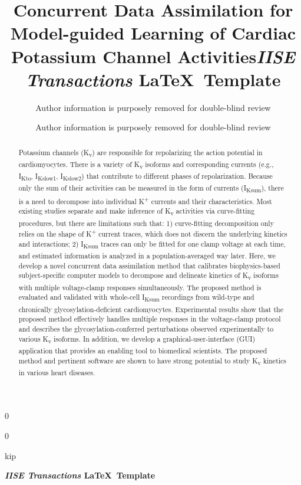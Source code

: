 \documentclass[11pt]{article}
\newcommand{\blind}{0}
\begin{document}
	\def\spacingset#1{\renewcommand{\baselinestretch}%
		{#1}\small\normalsize} \spacingset{1}

	\blind
	{
		\title{\bf Concurrent Data Assimilation for Model-guided Learning of Cardiac Potassium Channel Activities}
		\author{Author information is purposely removed for double-blind review}
		\date{}
		\maketitle
	} \fi

	\blind
	{
        \title{\bf \emph{IISE Transactions} \LaTeX \ Template}
		\author{Author information is purposely removed for double-blind review}

\bigskip
		\bigskip
		\bigs   kip
		\begin{center}
			{\LARGE\bf \emph{IISE Transactions} \LaTeX \ Template}
		\end{center}
		\medskip
	} \fi
	\bigskip

\begin{abstract}
Potassium channels (K\textsubscript{v}) are responsible for repolarizing the action potential in cardiomyocytes. There is a variety of K\textsubscript{v} isoforms and corresponding currents (e.g., I\textsubscript{Kto}, I\textsubscript{Kslow1}, I\textsubscript{Kslow2}) that contribute to different phases of repolarization. Because only the sum of their activities can be measured in the form of currents (I\textsubscript{Ksum}), there is a need to decompose into individual K\textsuperscript{+} currents and their characteristics. Most existing studies separate and make inference of K\textsubscript{v} activities via curve-fitting procedures, but there are limitations such that: 1) curve-fitting decomposition only relies on the shape of K\textsuperscript{+} current traces, which does not discern the underlying kinetics and interactions; 2) I\textsubscript{Ksum} traces can only be fitted for one clamp voltage at each time, and estimated information is analyzed in a population-averaged way later. Here, we develop a novel concurrent data assimilation method that calibrates biophysics-based subject-specific computer models to decompose and delineate kinetics of K\textsubscript{v} isoforms with multiple voltage-clamp responses simultaneously. The proposed method is evaluated and validated with whole-cell I\textsubscript{Ksum} recordings from wild-type and chronically glycosylation-deficient cardiomyocytes. Experimental results show that the proposed method effectively handles multiple responses in the voltage-clamp protocol and describes the glycosylation-conferred perturbations observed experimentally to various K\textsubscript{v} isoforms. In addition, we develop a graphical-user-interface (GUI) application that provides an enabling tool to biomedical scientists. The proposed method and pertinent software are shown to have strong potential to study K\textsubscript{v} kinetics in various heart diseases.
\end{abstract}
\end{document}
